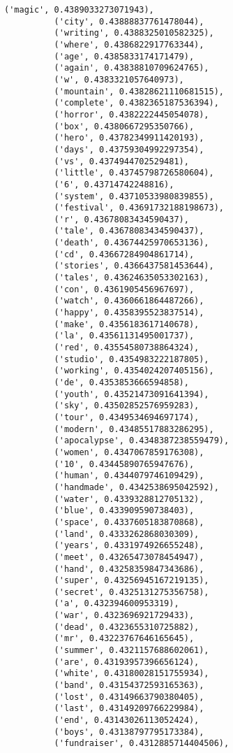 \documentclass[11pt]{article}
\begin{document}
\begin{Verbatim}[commandchars=\\\{\}]
          ('magic', 0.4389033273071943),
          ('city', 0.43888837761478044),
          ('writing', 0.4388325010582325),
          ('where', 0.4386822917763344),
          ('age', 0.4385833174171479),
          ('again', 0.43838810709624765),
          ('w', 0.4383321057640973),
          ('mountain', 0.43828621110681515),
          ('complete', 0.4382365187536394),
          ('horror', 0.4382222445054078),
          ('box', 0.4380667295350766),
          ('hero', 0.43782349911420193),
          ('days', 0.43759304992297354),
          ('vs', 0.4374944702529481),
          ('little', 0.43745798726580604),
          ('6', 0.43714742248816),
          ('system', 0.43710533980839855),
          ('festival', 0.43691732188198673),
          ('r', 0.43678083434590437),
          ('tale', 0.43678083434590437),
          ('death', 0.43674425970653136),
          ('cd', 0.43667284904861714),
          ('stories', 0.4366437581453644),
          ('tales', 0.43624635053302163),
          ('con', 0.4361905456967697),
          ('watch', 0.4360661864487266),
          ('happy', 0.4358395523837514),
          ('make', 0.4356183617140678),
          ('la', 0.43561131495001737),
          ('red', 0.43554580738864324),
          ('studio', 0.4354983222187805),
          ('working', 0.4354024207405156),
          ('de', 0.4353853666594858),
          ('youth', 0.43521473091641394),
          ('sky', 0.43502852576959283),
          ('tour', 0.4349534694697174),
          ('modern', 0.43485517883286295),
          ('apocalypse', 0.4348387238559479),
          ('women', 0.4347067859176308),
          ('10', 0.43445890765947676),
          ('human', 0.4344079746109429),
          ('handmade', 0.4342538695042592),
          ('water', 0.4339328812705132),
          ('blue', 0.433909590738403),
          ('space', 0.4337605183870868),
          ('land', 0.4333262868030309),
          ('years', 0.4331974926655248),
          ('meet', 0.43265473078454947),
          ('hand', 0.43258359847343686),
          ('super', 0.43256945167219135),
          ('secret', 0.4325131275356758),
          ('a', 0.432394600953319),
          ('war', 0.4323696921729433),
          ('dead', 0.4323655310725882),
          ('mr', 0.43223767646165645),
          ('summer', 0.4321157688602061),
          ('are', 0.43193957396656124),
          ('white', 0.43180028151755934),
          ('band', 0.43154372593165363),
          ('lost', 0.43149663790380405),
          ('last', 0.43149209766229984),
          ('end', 0.43143026113052424),
          ('boys', 0.43138797795173384),
          ('fundraiser', 0.4312885714404506),

\end{Verbatim}
\end{document}
